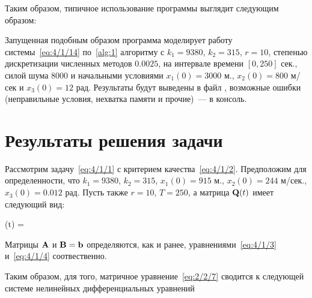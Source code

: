 Таким образом, типичное использование программы выглядит следующим образом:


Запущенная подобным образом программа моделирует работу системы~\vref{eq:4/1/14} по~\ref{alg:1} алгоритму с $k_1=9380$, $k_2=315$, $r=10$, степенью дискретизации численных методов $0.0025$, на интервале времени $[0, 250]$ сек., силой шума $8000$ и начальными условиями $x_1(0)=3000$ м., $x_2(0)=800$ м/сек и $x_3(0)=12$ рад. Результаты будут выведены в файл , возможные ошибки (неправильные условия, нехватка памяти и прочие)~--- в консоль.



\section{Результаты решения задачи}



Рассмотрим задачу~\vref{eq:4/1/1} с критерием качества~\vref{eq:4/1/2}. Предположим для определенности, что $k_1=9380$, $k_2=315$, $x_1(0)=915$ м., $x_2(0)=244$ м/сек., $x_3(0)=0.012$ рад. Пусть также $r=10$, $T=250$, а матрица $\mathbf{Q}(t)$ имеет следующий вид:

	(t) =   
\eeq

Матрицы $\mathbf{A}$ и $\mathbf{B} = \mathbf{b}$ определяются, как и ранее, уравнениями~\ref{eq:4/1/3} и~\vref{eq:4/1/4} соотвественно.

Таким образом, для того, матричное уравнение~\vref{eq:2/2/7} сводится к следующей системе нелинейных дифференциальных уравнений

